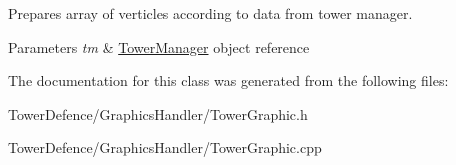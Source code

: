 Prepares array of verticles according to data from tower manager. 


\begin{DoxyParams}{Parameters}
{\em tm} & \mbox{\hyperlink{class_tower_manager}{Tower\+Manager}} object reference \\
\hline
\end{DoxyParams}


The documentation for this class was generated from the following files\+:\begin{DoxyCompactItemize}
\item 
Tower\+Defence/\+Graphics\+Handler/Tower\+Graphic.\+h\item 
Tower\+Defence/\+Graphics\+Handler/Tower\+Graphic.\+cpp\end{DoxyCompactItemize}
